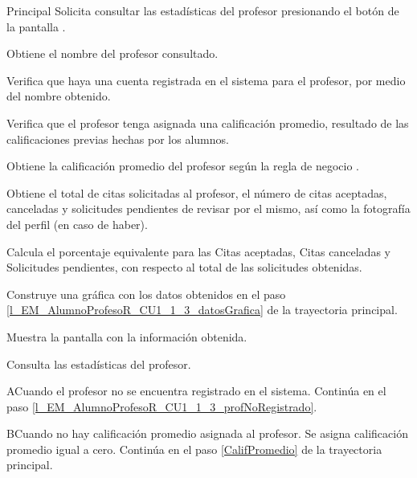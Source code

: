 \begin{UCtrayectoria}{Principal}
	\UCpaso [\UCactor] Solicita consultar las estadísticas del profesor presionando el botón  de la pantalla .

	\UCpaso Obtiene el nombre del profesor consultado. 

	\UCpaso Verifica que haya una cuenta registrada en el sistema para el profesor, por medio del nombre obtenido.

	\UCpaso Verifica que el profesor tenga asignada una calificación promedio, resultado de las calificaciones previas hechas por los alumnos.  

	\UCpaso Obtiene la calificación promedio del profesor según la regla de negocio . \label{CalifPromedio}  

	\UCpaso Obtiene el total de citas solicitadas al profesor, el número de citas aceptadas, canceladas y solicitudes pendientes de revisar por el mismo, así como la fotografía del perfil (en caso de haber). 

	\UCpaso Calcula el porcentaje equivalente para las Citas aceptadas, Citas canceladas y Solicitudes pendientes, con respecto al total de las solicitudes obtenidas. \label{l_EM_AlumnoProfesoR_CU1_1_3_datosGrafica}

	\UCpaso Construye una gráfica con los datos obtenidos en el paso \ref{l_EM_AlumnoProfesoR_CU1_1_3_datosGrafica} de la trayectoria principal.

	\UCpaso Muestra la pantalla  con la información obtenida. \label{l_EM_AlumnoProfesoR_CU1_1_3_profNoRegistrado}
	
	\UCpaso [\UCactor] Consulta las estadísticas del profesor.

\end{UCtrayectoria}

\begin{UCtrayectoriaA}{A}{Cuando el profesor no se encuentra registrado en el sistema.}
	\UCpaso	Continúa en el paso \ref{l_EM_AlumnoProfesoR_CU1_1_3_profNoRegistrado}.
\end{UCtrayectoriaA}

\begin{UCtrayectoriaA}{B}{Cuando no hay calificación promedio asignada al profesor.}
	\UCpaso	Se asigna calificación promedio igual a cero.
	\UCpaso Continúa en el paso \ref{CalifPromedio} de la trayectoria principal.
\end{UCtrayectoriaA}


